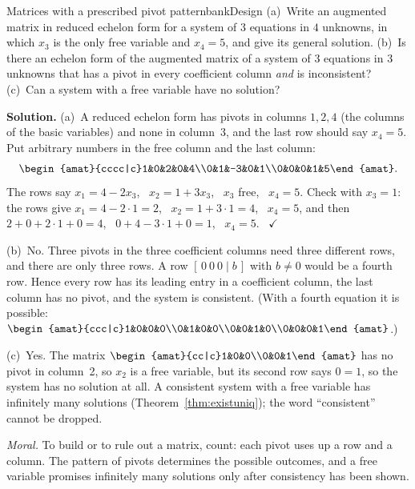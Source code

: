 \documentclass[11pt]{article}
\begin{document}
\begin{exmp}{Matrices with a prescribed pivot pattern}{bankDesign}
(a)~Write an augmented matrix in reduced echelon form for a system of $3$ equations in $4$ unknowns, in which $x_3$ is the only free variable and $x_4=5$, and give its general solution. (b)~Is there an echelon form of the augmented matrix of a system of $3$ equations in $3$ unknowns that has a pivot in every coefficient column \emph{and} is inconsistent? (c)~Can a system with a free variable have no solution?

\textbf{Solution.} (a)~A reduced echelon form has pivots in columns $1,2,4$ (the columns of the basic variables) and none in column~3, and the last row should say $x_4=5$. Put arbitrary numbers in the free column and the last column:
\[
\begin{amat}{cccc|c}1&0&2&0&4\\0&1&-3&0&1\\0&0&0&1&5\end{amat}.
\]
The rows say $x_1=4-2x_3$, \ $x_2=1+3x_3$, \ $x_3$ free, \ $x_4=5$. Check with $x_3=1$: the rows give $x_1=4-2\cdot1=2$, \ $x_2=1+3\cdot1=4$, \ $x_4=5$, and then $2+0+2\cdot1+0=4$, \ $0+4-3\cdot1+0=1$, \ $x_4=5$. \ $\checkmark$

(b)~No. Three pivots in the three coefficient columns need three different rows, and there are only three rows. A row $[\,0\ 0\ 0\mid b\,]$ with $b\neq0$ would be a fourth row. Hence every row has its leading entry in a coefficient column, the last column has no pivot, and the system is consistent. (With a fourth equation it is possible: $\begin{amat}{ccc|c}1&0&0&0\\0&1&0&0\\0&0&1&0\\0&0&0&1\end{amat}$.)

(c)~Yes. The matrix $\begin{amat}{cc|c}1&0&0\\0&0&1\end{amat}$ has no pivot in column~2, so $x_2$ is a free variable, but its second row says $0=1$, so the system has no solution at all. A consistent system with a free variable has infinitely many solutions (Theorem~\ref{thm:existuniq}); the word ``consistent'' cannot be dropped.

\emph{Moral.} To build or to rule out a matrix, count: each pivot uses up a row and a column. The pattern of pivots determines the possible outcomes, and a free variable promises infinitely many solutions only after consistency has been shown.
\end{exmp}
\end{document}
